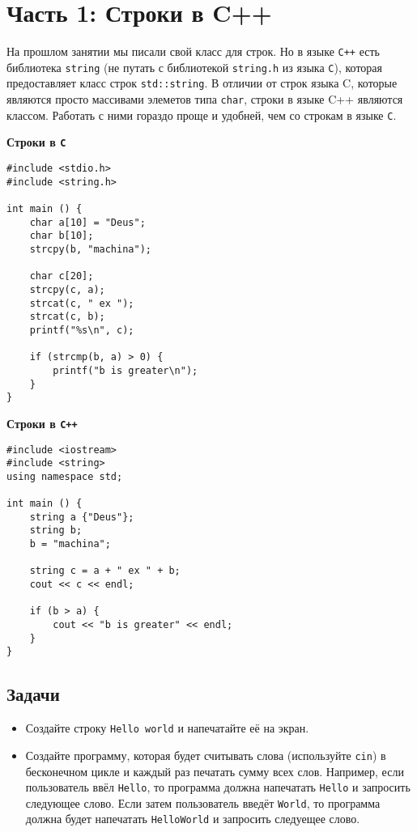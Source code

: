 \documentclass{article}
\begin{document}
\section*{Часть 1: Строки в C++}
На прошлом занятии мы писали свой класс для строк. Но в языке \texttt{C++} есть библиотека \texttt{string} (не путать с библиотекой \texttt{string.h} из языка \texttt{C}), которая предоставляет класс строк \texttt{std::string}. В отличии от строк языка C, которые являются просто массивами элеметов типа \texttt{char}, строки в языке C++ являются классом. Работать с ними гораздо проще и удобней, чем со строкам в языке \texttt{C}.
\begin{multicols}{2}
\textbf{Строки в \texttt{C}}
\begin{lstlisting}
#include <stdio.h>
#include <string.h> 

int main () {
    char a[10] = "Deus";
    char b[10];
    strcpy(b, "machina");
    
    char c[20];
    strcpy(c, a);
    strcat(c, " ex ");
    strcat(c, b);
    printf("%s\n", c);
    
    if (strcmp(b, a) > 0) {
        printf("b is greater\n");
    }
}
\end{lstlisting}
\vfill\null
\columnbreak
\textbf{Строки в \texttt{C++}}
\begin{lstlisting}
#include <iostream>
#include <string> 
using namespace std;

int main () {
    string a {"Deus"};
    string b;
    b = "machina";
    
    string c = a + " ex " + b;
    cout << c << endl;
    
    if (b > a) {
        cout << "b is greater" << endl;
    }
}
\end{lstlisting}
\end{multicols}

\subsection*{Задачи}
\begin{itemize}
\item Создайте строку \texttt{Hello world} и напечатайте её на экран.
\item Создайте программу, которая будет считывать слова (используйте \texttt{cin}) в бесконечном цикле и каждый раз печатать сумму всех слов. Например, если пользователь ввёл \texttt{Hello}, то программа должна напечатать \texttt{Hello} и запросить следующее слово. Если затем пользователь введёт \texttt{World}, то программа должна будет напечатать \texttt{HelloWorld} и запросить следуещее слово.
\end{itemize}
\end{document}
